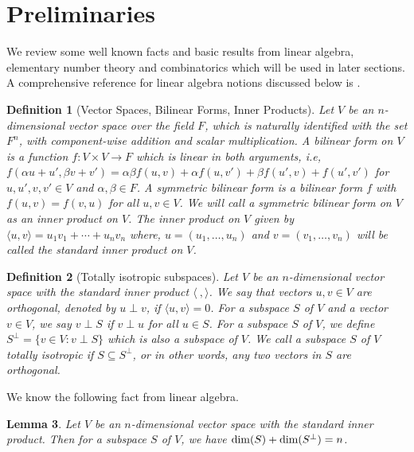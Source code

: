 \documentclass[12pt]{article}
\newcommand{\dimn}[1]{{\rm dim}(#1)}
\newcommand{\inpr}[2]{\langle #1,#2\rangle}
\newtheorem{defn}{{\bf Definition}}[section]
\newtheorem{lemma}[defn]{{\bf Lemma}}
\begin{document}
\section{Preliminaries}
We review some well known facts and basic results from linear algebra,
elementary number theory and combinatorics which will be used in later
sections. A comprehensive reference for linear algebra notions discussed
below is \cite{babaifrankl}. 

\begin{defn}[Vector Spaces, Bilinear Forms, Inner Products]{\rm
Let $V$ be an $n$-dimensional vector space over the field $F$, which is naturally identified
with the set $F^n$, with component-wise addition and scalar multiplication.
A {\em bilinear form} on $V$ is a function
$f: V\times V\rightarrow F$ which is linear in both arguments, i.e,
$f(\alpha u+u',\beta v+v')=\alpha\beta f(u,v)+\alpha f(u,v')+\beta
f(u',v)+f(u',v')$ for $u,u',v,v'\in V$ and $\alpha,\beta\in F$. A {\em
symmetric } bilinear form is a bilinear form $f$ with $f(u,v)=f(v,u)$ for
all $u,v\in V$. We will call a symmetric bilinear form on $V$ as an {\em
inner product} on $V$. The inner product on $V$ given by
$\inpr{u}{v}=u_1v_1+\cdots+u_nv_n$ where, 
$u=(u_1,\ldots,u_n)$ and $v=(v_1,\ldots,v_n)$ will be called the {\em
standard} inner product on $V$.
}
\end{defn}

\begin{defn}[Totally isotropic subspaces]{\rm
Let $V$ be an $n$-dimensional vector space with the standard inner product
$\langle\:,\rangle$. We say that vectors $u,v\in V$ are {\em orthogonal},
denoted by $u\perp v$, if
$\langle u,v\rangle = 0$. For a subspace $S$ of $V$ and a vector $v\in V$, we
say $v\perp S$ if $v\perp u$ for all $u\in S$. For a subspace $S$ of $V$,
we define $S^{\perp} = \{v\in V: v\perp S\}$ which is also a subspace of
$V$. We call a subspace $S$ of $V$ {\em totally isotropic} if $S\subseteq
S^{\perp}$, or in other words, any two vectors in $S$ are orthogonal.
}
\end{defn}
We know the following fact from linear algebra.
\begin{lemma}\label{lem:lafact}
Let $V$ be an $n$-dimensional vector space with the standard inner product. Then for a subspace $S$ of $V$, we have
$\dimn{S}+\dimn{S^\perp}=n$. 
\end{lemma}
\end{document}
